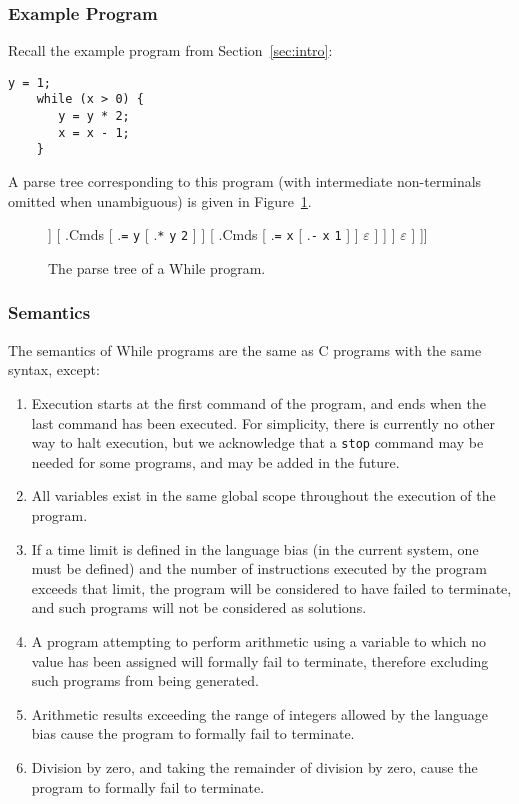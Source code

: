 \documentclass[a4paper,twoside,notitlepage]{article}
\newcommand{\ttt}{\texttt}
\begin{document}
\subsubsection{Example Program}

Recall the example program from Section~\ref{sec:intro}:
\begin{Verbatim}[samepage=true]
    y = 1;
    while (x > 0) {
       y = y * 2;
       x = x - 1;
    }
\end{Verbatim}

A parse tree corresponding to this program (with intermediate non-terminals 
omitted when unambiguous) is given in Figure~\ref{fig:parsetree}.

\begin{figure}[h]
  \caption{The parse tree of a While program.}
  \label{fig:parsetree}
  \Tree[ .Prog [ .Cmds
    [ .\ttt{=} \ttt{y} \ttt{1} ]
    [ .Cmds
      [ .\ttt{while}
        [ .Bool [ .\ttt{>} \ttt{x} \ttt{0} ] ]
        [ .Cmds
          [ .\ttt{=} \ttt{y} [ .\ttt{*} \ttt{y} \ttt{2} ] ]
          [ .Cmds
            [ .\ttt{=} \ttt{x} [ .\ttt{-} \ttt{x} \ttt{1} ] ]
            $\varepsilon$
          ]
        ]
      ]
      $\varepsilon$
    ]
  ]]
\end{figure}

\subsubsection{Semantics}
The semantics of While programs are the same as C programs with the same 
syntax, except:
\begin{enumerate}
    \item Execution starts at the first command of the program, and ends when 
    the last command has been executed. For simplicity, there is currently no 
    other way to halt execution, but we acknowledge that a \ttt{stop} command 
    may be needed for some programs, and may be added in the future.
    \item All variables exist in the same global scope throughout the 
    execution of the program.
    \item If a time limit is defined in the language bias (in the current 
    system, one must be defined) and the number of instructions executed by 
    the program exceeds that limit, the program will be considered to have 
    failed to terminate, and such programs will not be considered as 
solutions.
    \item A program attempting to perform arithmetic using a variable to which
    no value has been assigned will formally fail to terminate, therefore 
    excluding such programs from being generated.
    \item Arithmetic results exceeding the range of integers allowed by the 
    language bias cause the program to formally fail to terminate.
    \item Division by zero, and taking the remainder of division by zero,
    cause the program to formally fail to terminate.
\end{enumerate}
\end{document}
